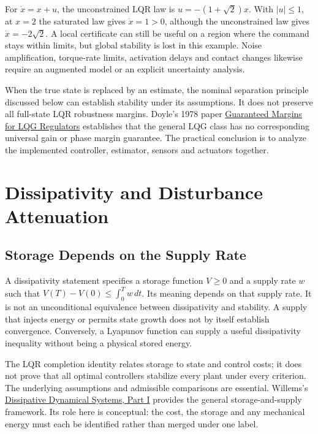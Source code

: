 For $\dot x=x+u$, the unconstrained LQR law is $u=-(1+\sqrt2)x$. With $|u|\le1$, at $x=2$ the saturated law gives $\dot x=1>0$, although the unconstrained law gives $\dot x=-2\sqrt2$. A local certificate can still be useful on a region where the command stays within limits, but global stability is lost in this example. Noise amplification, torque-rate limits, activation delays and contact changes likewise require an augmented model or an explicit uncertainty analysis.

When the true state is replaced by an estimate, the nominal separation principle discussed below can establish stability under its assumptions. It does not preserve all full-state LQR robustness margins. Doyle's 1978 paper \href{https://authors.library.caltech.edu/records/e39yd-evs06}{Guaranteed Margins for LQG Regulators} establishes that the general LQG class has no corresponding universal gain or phase margin guarantee. The practical conclusion is to analyze the implemented controller, estimator, sensors and actuators together.

\section{Dissipativity and Disturbance Attenuation}

\subsection{Storage Depends on the Supply Rate}

A dissipativity statement specifies a storage function $V\ge0$ and a supply rate $w$ such that $V(T)-V(0)\le\int_0^T w\,dt$. Its meaning depends on that supply rate. It is not an unconditional equivalence between dissipativity and stability. A supply that injects energy or permits state growth does not by itself establish convergence. Conversely, a Lyapunov function can supply a useful dissipativity inequality without being a physical stored energy.

The LQR completion identity relates storage to state and control costs; it does not prove that all optimal controllers stabilize every plant under every criterion. The underlying assumptions and admissible comparisons are essential. Willems's \href{https://doi.org/10.1007/BF00276493}{Dissipative Dynamical Systems, Part I} provides the general storage-and-supply framework. Its role here is conceptual: the cost, the storage and any mechanical energy must each be identified rather than merged under one label.

